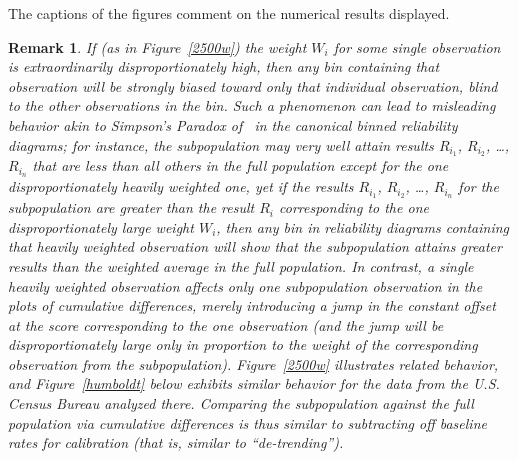 \documentclass{article}
\newtheorem{remark1}[theorem]{Remark}
\newenvironment{remark}{\begin{remark1} \rm}{\end{remark1}}
\begin{document}
The captions of the figures comment on the numerical results displayed.

\begin{remark}
\label{Simpson}
If (as in Figure~\ref{2500w}) the weight $W_i$ for some single observation
is extraordinarily disproportionately high, then any bin
containing that observation will be strongly biased toward only that individual
observation, blind to the other observations in the bin. Such a phenomenon
can lead to misleading behavior akin to Simpson's Paradox of~\cite{simpson}
in the canonical binned reliability diagrams; for instance,
the subpopulation may very well
attain results $R_{i_1}$, $R_{i_2}$, \dots, $R_{i_n}$ that are {\it less} than
all others in the full population except for the one disproportionately heavily
weighted one, yet if the results $R_{i_1}$, $R_{i_2}$, \dots, $R_{i_n}$
for the subpopulation are greater than the result $R_i$ corresponding
to the one disproportionately large weight $W_i$, then
any bin in reliability diagrams containing that heavily weighted observation
will show that the subpopulation attains {\it greater} results
than the weighted average in the full population.
In contrast, a single heavily weighted observation affects
only one subpopulation observation in the plots of cumulative differences,
merely introducing a jump in the constant offset
at the score corresponding to the one observation
(and the jump will be disproportionately large only in proportion
to the weight of the corresponding observation from the subpopulation).
Figure~\ref{2500w} illustrates related behavior,
and Figure~\ref{humboldt} below exhibits similar behavior
for the data from the U.S. Census Bureau analyzed there.
Comparing the subpopulation against the full population
via cumulative differences is thus similar to subtracting off baseline rates
for calibration (that is, similar to ``de-trending'').
\end{remark}
\end{document}
